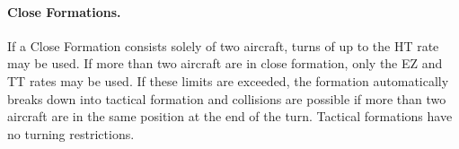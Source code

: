 \begin{advancedrules}
{\paragraph{Close Formations.} If a Close Formation consists solely of two aircraft, turns of up to the HT rate may be used. If more than two aircraft are in close formation, only the EZ and TT rates may be used. If these limits are exceeded, the formation automatically breaks down into tactical formation and collisions are possible if more than two aircraft are in the same position at the end of the turn. Tactical formations have no turning restrictions.
}
\end{advancedrules}
